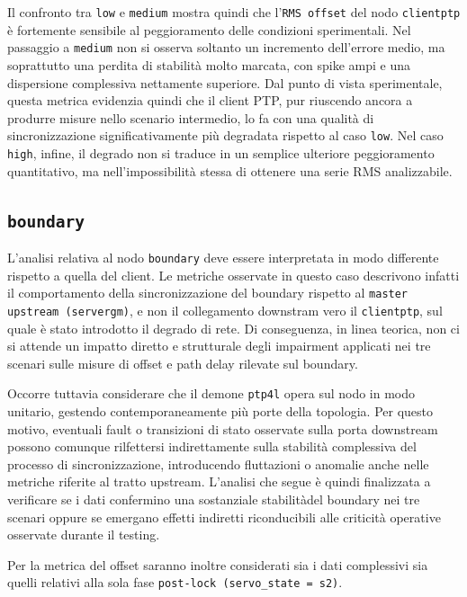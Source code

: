 Il confronto tra \texttt{low} e \texttt{medium} mostra quindi che l’\texttt{RMS
offset} del nodo \texttt{clientptp} è fortemente sensibile al peggioramento
delle condizioni sperimentali. Nel passaggio a \texttt{medium} non si osserva
soltanto un incremento dell’errore medio, ma soprattutto una perdita di stabilità
molto marcata, con spike ampi e una dispersione complessiva nettamente superiore.
Dal punto di vista sperimentale, questa metrica evidenzia quindi che il client
PTP, pur riuscendo ancora a produrre misure nello scenario intermedio, lo fa con
una qualità di sincronizzazione significativamente più degradata rispetto al
caso \texttt{low}. Nel caso \texttt{high}, infine, il degrado non si traduce in un
semplice ulteriore peggioramento quantitativo, ma nell’impossibilità stessa di
ottenere una serie RMS analizzabile.

\subsection{\texttt{boundary}}
L'analisi relativa al nodo \texttt{boundary} deve essere interpretata in modo differente
rispetto a quella del client. Le metriche osservate in questo caso descrivono
infatti il comportamento della sincronizzazione del boundary rispetto al \texttt{master
upstream (servergm)}, e non il collegamento downstram vero il \texttt{clientptp},
sul quale è stato introdotto il degrado di rete. Di conseguenza, in linea
teorica, non ci si attende un impatto diretto e strutturale degli impairment applicati
nei tre scenari sulle misure di offset e path delay rilevate sul boundary.

Occorre tuttavia considerare che il demone \texttt{ptp4l} opera sul nodo in modo
unitario, gestendo contemporaneamente più porte della topologia. Per questo
motivo, eventuali fault o transizioni di stato osservate sulla porta downstream possono
comunque rilfettersi indirettamente sulla stabilità complessiva del processo di sincronizzazione,
introducendo fluttazioni o anomalie anche nelle metriche riferite al tratto
upstream. L'analisi che segue è quindi finalizzata a verificare se i dati confermino
una sostanziale stabilitàdel boundary nei tre scenari oppure se emergano effetti indiretti
riconducibili alle criticità operative osservate durante il testing.

Per la metrica del offset saranno inoltre considerati sia i dati complessivi sia quelli
relativi alla sola fase \texttt{post-lock (servo\_state = s2)}.

